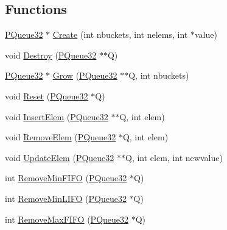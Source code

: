 \subsection*{Functions}
\begin{DoxyCompactItemize}
\item 
\hyperlink{namespacegft_1_1PQueue32_a27686e3155a7097ff40a4e88958bb50e}{P\-Queue32} $\ast$ \hyperlink{namespacegft_1_1PQueue32_a96ba9f507866e578862dcef05b82c101}{Create} (int nbuckets, int nelems, int $\ast$value)
\item 
void \hyperlink{namespacegft_1_1PQueue32_a9c1ec41912ee427cff7425ff4048d29a}{Destroy} (\hyperlink{namespacegft_1_1PQueue32_a27686e3155a7097ff40a4e88958bb50e}{P\-Queue32} $\ast$$\ast$Q)
\item 
\hyperlink{namespacegft_1_1PQueue32_a27686e3155a7097ff40a4e88958bb50e}{P\-Queue32} $\ast$ \hyperlink{namespacegft_1_1PQueue32_a5dc83e5e36ed9a3a22f0b16a87066854}{Grow} (\hyperlink{namespacegft_1_1PQueue32_a27686e3155a7097ff40a4e88958bb50e}{P\-Queue32} $\ast$$\ast$Q, int nbuckets)
\item 
void \hyperlink{namespacegft_1_1PQueue32_a29365352a9afa987b9239a5bb14e958b}{Reset} (\hyperlink{namespacegft_1_1PQueue32_a27686e3155a7097ff40a4e88958bb50e}{P\-Queue32} $\ast$Q)
\item 
void \hyperlink{namespacegft_1_1PQueue32_a7e43098472b9f69413974b505fff8810}{Insert\-Elem} (\hyperlink{namespacegft_1_1PQueue32_a27686e3155a7097ff40a4e88958bb50e}{P\-Queue32} $\ast$$\ast$Q, int elem)
\item 
void \hyperlink{namespacegft_1_1PQueue32_a0413b1dfa6c7dda7e21b6cc907481a78}{Remove\-Elem} (\hyperlink{namespacegft_1_1PQueue32_a27686e3155a7097ff40a4e88958bb50e}{P\-Queue32} $\ast$Q, int elem)
\item 
void \hyperlink{namespacegft_1_1PQueue32_a18c8cf3ae8f0c425766a0a562a0ebc14}{Update\-Elem} (\hyperlink{namespacegft_1_1PQueue32_a27686e3155a7097ff40a4e88958bb50e}{P\-Queue32} $\ast$$\ast$Q, int elem, int newvalue)
\item 
int \hyperlink{namespacegft_1_1PQueue32_af348da84505ce5cab41c78e472d698b1}{Remove\-Min\-F\-I\-F\-O} (\hyperlink{namespacegft_1_1PQueue32_a27686e3155a7097ff40a4e88958bb50e}{P\-Queue32} $\ast$Q)
\item 
int \hyperlink{namespacegft_1_1PQueue32_a885b0ac4cbada8fa386b5435c953ff5d}{Remove\-Min\-L\-I\-F\-O} (\hyperlink{namespacegft_1_1PQueue32_a27686e3155a7097ff40a4e88958bb50e}{P\-Queue32} $\ast$Q)
\item 
int \hyperlink{namespacegft_1_1PQueue32_a0cf69b5a9e9a42d4508e22ffbb1c9a2c}{Remove\-Max\-F\-I\-F\-O} (\hyperlink{namespacegft_1_1PQueue32_a27686e3155a7097ff40a4e88958bb50e}{P\-Queue32} $\ast$Q)

\end{DoxyCompactItemize}
